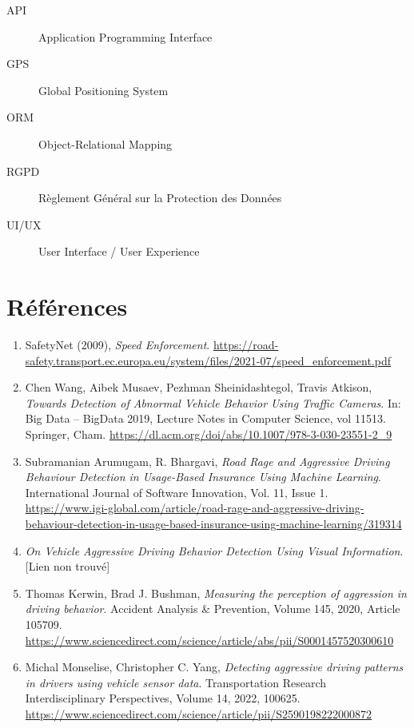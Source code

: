 \documentclass[12pt,a4paper]{article}
\begin{document}
\begin{description}
    \item[API] Application Programming Interface
    \item[GPS] Global Positioning System
    \item[ORM] Object-Relational Mapping
    \item[RGPD] Règlement Général sur la Protection des Données
    \item[UI/UX] User Interface / User Experience
\end{description}

\section{Références}

\begin{enumerate}
    \item SafetyNet (2009), \textit{Speed Enforcement}. \url{https://road-safety.transport.ec.europa.eu/system/files/2021-07/speed_enforcement.pdf}
    
    \item Chen Wang, Aibek Musaev, Pezhman Sheinidashtegol, Travis Atkison, \textit{Towards Detection of Abnormal Vehicle Behavior Using Traffic Cameras}. In: Big Data – BigData 2019, Lecture Notes in Computer Science, vol 11513. Springer, Cham. \url{https://dl.acm.org/doi/abs/10.1007/978-3-030-23551-2_9}
    
    \item Subramanian Arumugam, R. Bhargavi, \textit{Road Rage and Aggressive Driving Behaviour Detection in Usage-Based Insurance Using Machine Learning}. International Journal of Software Innovation, Vol. 11, Issue 1. \url{https://www.igi-global.com/article/road-rage-and-aggressive-driving-behaviour-detection-in-usage-based-insurance-using-machine-learning/319314}
    
    \item \textit{On Vehicle Aggressive Driving Behavior Detection Using Visual Information}. [Lien non trouvé]
    
\item Thomas Kerwin, Brad J. Bushman, \textit{Measuring the perception of aggression in driving behavior}. Accident Analysis \& Prevention, Volume 145, 2020, Article 105709. \url{https://www.sciencedirect.com/science/article/abs/pii/S0001457520300610}
    
    \item Michal Monselise, Christopher C. Yang, \textit{Detecting aggressive driving patterns in drivers using vehicle sensor data}. Transportation Research Interdisciplinary Perspectives, Volume 14, 2022, 100625. \url{https://www.sciencedirect.com/science/article/pii/S2590198222000872}
    

\end{enumerate}
\end{document}
